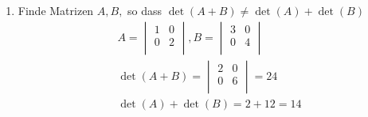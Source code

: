 \documentclass{HM}
\begin{document}
\begin{enumerate}
\begin{enumerate}
			\item Finde Matrizen $A,B,$ so dass $\det(A+B)\not=\det(A)+\det(B)$\\
			\begin{align*}
				A=\begin{vmatrix}
					1&0\\
					0&2\\
				\end{vmatrix},
				B=\begin{vmatrix}
					3&0\\
					0&4\\
				\end{vmatrix}\\
			\det(A+B)  = \begin{vmatrix}
				2&0\\
				0&6\\
			\end{vmatrix}= 24\\
			\det(A) + \det(B) = 2 + 12 = 14\\
			\end{align*}\\
		
		\end{enumerate}
		

\end{enumerate}
\end{document}
